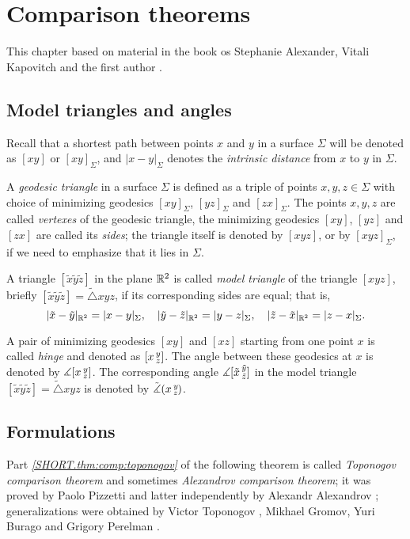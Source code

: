 \chapter{Comparison theorems}

This chapter based on material in the book os Stephanie Alexander, Vitali Kapovitch and the first author \cite{alexander-kapovitch-petrunin2027}.

\section{Model triangles and angles}

Recall that a shortest path between points $x$ and $y$ in a surface $\Sigma$ will be denoted as $[xy]$ or $[xy]_\Sigma$, and
$|x-y|_\Sigma$ denotes the \emph{intrinsic distance} from $x$ to $y$ in $\Sigma$.

A \emph{geodesic triangle} in a surface $\Sigma$ is defined as a triple of points $x,y,z\in \Sigma$ with choice of minimizing geodesics $[xy]_\Sigma$, $[yz]_\Sigma$ and $[zx]_\Sigma$.
The points $x,y,z$ are called {}\emph{vertexes} of the geodesic triangle,
the minimizing geodesics $[xy]$, $[yz]$ and $[zx]$ are called its {}\emph{sides};
the triangle itself is denoted by $[xyz]$, or by $[xyz]_\Sigma$, if we need to emphasize that it lies in $\Sigma$.

A triangle $[\tilde x\tilde y\tilde z]$ in the plane $\mathbb{R}^2$ is called \emph{model triangle} of the triangle $[xyz]$,
briefly $[\tilde x\tilde y\tilde z]=\tilde\triangle xyz$,
\index{$\tilde\triangle$}
if its corresponding sides are equal;
that is,
\[|\tilde x-\tilde y|_{\mathbb{R}^2}=|x-y|_\Sigma,
\quad
|\tilde y-\tilde z|_{\mathbb{R}^2}=|y-z|_\Sigma,
\quad
|\tilde z-\tilde x|_{\mathbb{R}^2}=|z-x|_\Sigma.
\]

A pair of minimizing geodesics $[xy]$ and $[xz]$ starting from one point $x$ is called \emph{hinge} and denoted as $[x\,{}^{y}_{z}]$.
The angle between these geodesics at $x$ is denoted by $\measuredangle[x\,{}^{y}_{z}]$.
The corresponding angle $\measuredangle[\tilde x\,{}^{\tilde y}_{\tilde z}]$ in the model triangle $[\tilde x\tilde y\tilde z]=\tilde\triangle xyz$ is denoted by $\tilde\measuredangle(x\,{}^{y}_{z}\hspace{-0.2ex})$.

\section{Formulations}

Part \textit{\ref{SHORT.thm:comp:toponogov}} of the following theorem is called \emph{Toponogov comparison theorem} and sometimes \emph{Alexandrov comparison theorem};
it was proved by Paolo Pizzetti \cite{pizzetti} and latter independently by Alexandr Alexandrov \cite{alexandrov}; 
generalizations were obtained by  Victor Toponogov \cite{toponogov1957}, Mikhael Gromov, Yuri Burago and Grigory Perelman \cite{burago-gromov-perelman}.

